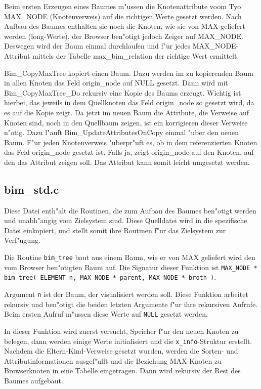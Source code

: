 Beim ersten Erzeugen eines Baumes m"ussen die Knotenattribute voom Tyo
MAX\_NODE (Knotenverweis) auf die richtigen Werte gesetzt werden. Nach Aufbau des Baumes enthalten sie noch die Knoten, wie sie von MAX geliefert werden
(long-Werte), der Browser ben"otigt jedoch Zeiger auf MAX\_NODE. Deswegen
wird der Baum einmal durchlaufen und f"ur jedes MAX\_NODE-Attribut mittels
der Tabelle max\_bim\_relation der richtige Wert ermittelt.

Bim\_CopyMaxTree kopiert einen Baum. Dazu werden im zu kopierenden
Baum in allen Knoten das Feld origin\_node auf NULL gesetzt. Dann
wird mit Bim\_CopyMaxTree\_Do rekursiv eine Kopie des Baums erzeugt.
Wichtig ist hierbei, das jeweils in dem Quellknoten das Feld origin\_node
so gesetzt wird, da\3 es auf die Kopie zeigt. Da jetzt im neuen Baum die
Attribute, die Verweise auf Knoten sind, noch in den Quellbaum zeigen, ist
ein korrigieren dieser Verweise n"otig. Dazu l"auft Bim\_UpdateAttributesOnCopy
einmal "uber den neuen Baum. F"ur jeden Knotenverweis "uberpr"uft es, ob in dem
referenzierten Knoten das Feld origin\_node gesetzt ist. Falls ja, zeigt origin\_node auf den Knoten, auf den das Attribut zeigen soll. Das Attribut kann
somit leicht umgesetzt werden.

\subsection{bim\_std.c}
Diese Datei enth"alt die Routinen, die zum Aufbau des Baumes ben"otigt
werden und unabh"angig vom Zielsystem sind. Diese Quelldatei wird in
die spezifische Datei einkopiert, und stellt somit ihre Routinen f"ur
das Zielsystem zur Verf"ugung.\par
Die Routine {\tt bim\_tree} baut aus einem Baum,
wie er von MAX geliefert wird den vom Browser ben"otigten Baum auf.
Die Signatur dieser Funktion ist 
{\tt MAX\_NODE * bim\_tree( ELEMENT n, MAX\_NODE * parent, MAX\_NODE * broth )}.\par
Argument {\tt n} ist der Baum, der visualisiert werden soll. Diese Funktion
arbeitet rekursiv und ben"otigt die beiden letzten Argumente f"ur ihre 
rekursiven Aufrufe. Beim ersten Aufruf m"ussen diese Werte auf {\tt NULL}
gesetzt werden.\par
In dieser Funktion wird zuerst versucht, Speicher f"ur den neuen Knoten zu
belegen, dann werden einige Werte initialisiert und die {\tt x\_info}-Struktur
erstellt. Nachdem die Eltern-Kind-Verweise gesetzt wurden, werden die
Sorten- und Attributinformationen ausgef"ullt und die Beziehung MAX-Knoten
zu Browserknoten in eine Tabelle eingetragen. Dann wird rekursiv der Rest
des Baumes aufgebaut.\par

